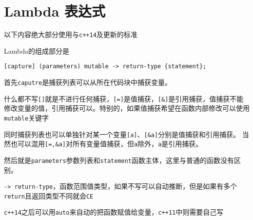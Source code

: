 \section{Lambda 表达式}
以下内容绝大部分使用与\verb|c++14|及更新的标准

Lambda的组成部分是
\begin{lstlisting}
[capture] (parameters) mutable -> return-type {statement};
\end{lstlisting}
首先\verb|caputre|是捕获列表可以从所在代码块中捕获变量。

什么都不写\verb|[]|就是不进行任何捕获，\verb|[=]|是值捕获，\verb|[&]|是引用捕获，值捕获不能修改变量的值，引用捕获可以。特别的，如果值捕获希望在函数内部修改可以使用\verb|mutable|关键字

同时捕获列表也可以单独针对某一个变量\verb|[a]|、\verb|[&a]|分别是值捕获和引用捕获。 当然也可以混用\verb|[=,&a]|对所有变量值捕获，但\verb|a|除外，\verb|a|是引用捕获。

然后就是\verb|parameters|参数列表和\verb|statement|函数主体，这里与普通的函数没有区别。

\verb|-> return-type|，函数范围值类型，如果不写可以自动推断，但是如果有多个\verb|return|且返回类型不同就会\verb|CE|

\verb|c++14|之后可以用\verb|auto|来自动的把函数赋值给变量，\verb|c++11|中则需要自己写